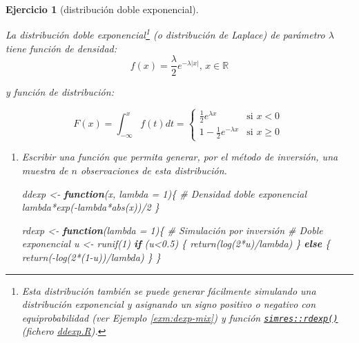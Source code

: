 \documentclass[
]{book}
\newenvironment{Shaded}{\begin{snugshade}}{\end{snugshade}}
\newcommand{\AttributeTok}[1]{\textcolor[rgb]{0.77,0.63,0.00}{#1}}
\newcommand{\CommentTok}[1]{\textcolor[rgb]{0.56,0.35,0.01}{\textit{#1}}}
\newcommand{\ControlFlowTok}[1]{\textcolor[rgb]{0.13,0.29,0.53}{\textbf{#1}}}
\newcommand{\DecValTok}[1]{\textcolor[rgb]{0.00,0.00,0.81}{#1}}
\newcommand{\FloatTok}[1]{\textcolor[rgb]{0.00,0.00,0.81}{#1}}
\newcommand{\FunctionTok}[1]{\textcolor[rgb]{0.00,0.00,0.00}{#1}}
\newcommand{\NormalTok}[1]{#1}
\newcommand{\OtherTok}[1]{\textcolor[rgb]{0.56,0.35,0.01}{#1}}
\newcommand{\SpecialCharTok}[1]{\textcolor[rgb]{0.00,0.00,0.00}{#1}}
\theoremstyle{break}
\newtheorem{exercise}{Ejercicio}[chapter]
\theoremstyle{nonumberplain}
\begin{document}
\begin{exercise}[distribución doble exponencial]
\protect\hypertarget{exr:ddexp}{}\label{exr:ddexp}

La distribución doble exponencial\footnote{Esta distribución también se puede generar fácilmente simulando una distribución exponencial y asignando un signo positivo o negativo con equiprobabilidad (ver Ejemplo \ref{exm:dexp-mix}) y función \href{https://rubenfcasal.github.io/simres/reference/ddexp.html}{\texttt{simres::rdexp()}} (fichero \href{R/ddexp.R}{\emph{ddexp.R}}).} (o distribución de Laplace) de
parámetro \(\lambda\) tiene función de densidad:
\[f(x)  =\frac{\lambda}{2}e^{-\lambda\left\vert x\right\vert
}\text{, }x\in\mathbb{R}\]

y función de distribución:

\[F(x)  =\int_{-\infty}^{x}f\left( t\right)  dt=\left\{
\begin{array}{ll}
\frac{1}{2}e^{\lambda x} & \text{si } x<0\\
1-\frac{1}{2}e^{-\lambda x} & \text{si } x\geq0
\end{array}
\ \right.\]

\begin{enumerate}
\def\labelenumi{\alph{enumi})}
\item
  Escribir una función que permita generar, por el método de
  inversión, una muestra de \(n\) observaciones de esta distribución.

\begin{Shaded}
\begin{Highlighting}[]
\NormalTok{ddexp }\OtherTok{\textless{}{-}} \ControlFlowTok{function}\NormalTok{(x, }\AttributeTok{lambda =} \DecValTok{1}\NormalTok{)\{}
\CommentTok{\# Densidad doble exponencial}
\NormalTok{  lambda}\SpecialCharTok{*}\FunctionTok{exp}\NormalTok{(}\SpecialCharTok{{-}}\NormalTok{lambda}\SpecialCharTok{*}\FunctionTok{abs}\NormalTok{(x))}\SpecialCharTok{/}\DecValTok{2}
\NormalTok{\}}

\NormalTok{rdexp }\OtherTok{\textless{}{-}} \ControlFlowTok{function}\NormalTok{(}\AttributeTok{lambda =} \DecValTok{1}\NormalTok{)\{}
\CommentTok{\# Simulación por inversión}
\CommentTok{\# Doble exponencial}
\NormalTok{  u }\OtherTok{\textless{}{-}} \FunctionTok{runif}\NormalTok{(}\DecValTok{1}\NormalTok{)}
  \ControlFlowTok{if}\NormalTok{ (u}\SpecialCharTok{\textless{}}\FloatTok{0.5}\NormalTok{) \{}
    \FunctionTok{return}\NormalTok{(}\FunctionTok{log}\NormalTok{(}\DecValTok{2}\SpecialCharTok{*}\NormalTok{u)}\SpecialCharTok{/}\NormalTok{lambda)}
\NormalTok{  \} }\ControlFlowTok{else}\NormalTok{ \{}
    \FunctionTok{return}\NormalTok{(}\SpecialCharTok{{-}}\FunctionTok{log}\NormalTok{(}\DecValTok{2}\SpecialCharTok{*}\NormalTok{(}\DecValTok{1}\SpecialCharTok{{-}}\NormalTok{u))}\SpecialCharTok{/}\NormalTok{lambda)}
\NormalTok{  \}}
\NormalTok{\}}


\end{Highlighting}
\end{Shaded}
\end{enumerate}
\end{exercise}
\end{document}
